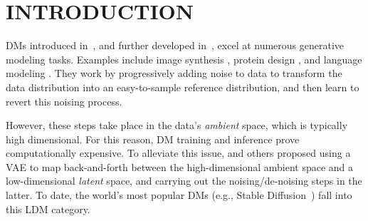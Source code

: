 \documentclass[twoside]{article}
\begin{document}

\makeatletter
\fancyhead[CE]{\small\bfseries\@runningtitle}
\fancyhead[CO]{\small\bfseries\@runningauthor}
\makeatother

\begin{abstract}
  We introduce a novel particle-based algorithm for end-to-end training of latent diffusion models. We reformulate the training task as minimizing a free energy functional and obtain a gradient flow that does so. By approximating the latter with a system of interacting particles, we obtain the algorithm, which we underpin theoretically by providing error guarantees. The novel algorithm compares favorably in experiments with previous particle-based methods and variational inference analogues.
\end{abstract}

\section{INTRODUCTION}
\glspl*{DM} introduced in~\cite{pmlr-v37-sohl-dickstein15}, and further developed in~\cite{hodenoisingdiffusionprobabilistic2020, songscorebasedgenerativemodeling2021}, excel at numerous generative modeling tasks. Examples include image synthesis \citep{dhariwal2021beatsGAN}, protein design \citep{watsonNovoDesignProtein2023}, and language modeling \citep{nieLargeLanguageDiffusion2025}. They work by progressively adding noise to data to transform the data distribution into an easy-to-sample reference distribution, and then learn to revert this noising process.

However, these steps take place in the data's \emph{ambient} space, which is typically high dimensional. For this reason, \gls*{DM} training and inference prove computationally expensive. To alleviate this issue, \cite{rombachhighresolutionimagesynthesis2022,vahdatscorebasedgenerativemodeling2021,wehenkeldiffusionpriorsvariational2021} and others proposed using a \gls*{VAE} \citep{Kingma2013AutoEncodingVB} to map back-and-forth between the high-dimensional ambient space and a low-dimensional \emph{latent} space, and carrying out the noising/de-noising steps in the latter. To date, the world's most popular \glspl*{DM} (e.g., Stable Diffusion~\citep{podell2024sdxl}) fall into this \gls*{LDM} category.
\end{document}
